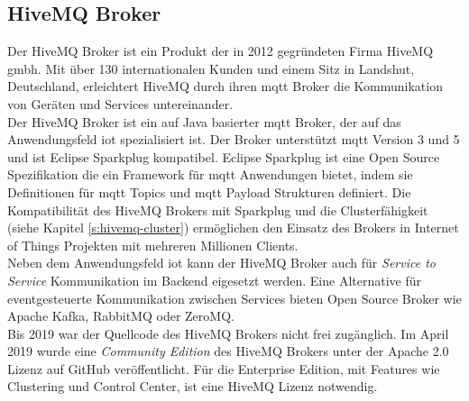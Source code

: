 \newpage

\subsection{HiveMQ Broker} \label{s:hivemq-broker}
Der HiveMQ Broker ist ein Produkt der in 2012 gegründeten Firma HiveMQ \acs{gmbh}. Mit über 130 internationalen Kunden und einem Sitz in Landshut, Deutschland, erleichtert HiveMQ durch ihren \ac{mqtt} Broker die Kommunikation von Geräten und Services untereinander.
\cite{HiveMQCompanya}
\\
Der HiveMQ Broker ist ein auf Java basierter \ac{mqtt} Broker, der auf das Anwendungsfeld \acl{iot} spezialisiert ist. Der Broker unterstützt \ac{mqtt} Version 3 und 5 und ist Eclipse Sparkplug kompatibel.
Eclipse Sparkplug ist eine Open Source Spezifikation die ein Framework für \ac{mqtt} Anwendungen bietet, indem sie Definitionen für \ac{mqtt} Topics und \ac{mqtt} Payload Strukturen definiert.
Die Kompatibilität des HiveMQ Brokers mit Sparkplug und die Clusterfähigkeit (siehe Kapitel \ref{s:hivemq-cluster}) ermöglichen den Einsatz des Brokers in Internet of Things Projekten mit mehreren Millionen Clients.
\cite{obermaierMQTTSparkplugEssentials}
\\
Neben dem Anwendungsfeld \ac{iot} kann der HiveMQ Broker auch für \textit{Service to Service} Kommunikation im Backend eigesetzt werden.
Eine Alternative für eventgesteuerte Kommunikation zwischen Services bieten Open Source Broker wie Apache Kafka, RabbitMQ oder ZeroMQ.
\\
Bis 2019 war der Quellcode des HiveMQ Brokers nicht frei zugänglich. Im April 2019 wurde eine \textit{Community Edition} des HiveMQ Brokers unter der Apache 2.0 Lizenz auf GitHub veröffentlicht. Für die Enterprise Edition, mit Features wie Clustering und Control Center, ist eine HiveMQ Lizenz notwendig.

